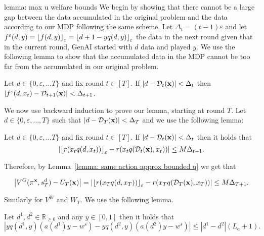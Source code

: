 \begin{proofof}{lemma: max u welfare bounds}
We begin by showing that there cannot be a large gap between the data accumulated in the original problem and the data according to our MDP following the same scheme.
Let $\Delta_t = (t-1)\varepsilon$ and let $f^\varepsilon(d, y) = {\left\lfloor f(d, y)\right\rfloor_{\varepsilon}} = {\left\lfloor d + 1 - yq(d, y)\right\rfloor_{\varepsilon}}$ the data in the next round given that in the current round, GenAI started with $d$ data and played $y$. We use the following lemma to show that the accumulated data in the MDP cannot be too far from the accumulated in our original problem.

\begin{lemma} \label{lemma: max u welfare data bound}
Let $d \in \{0, \varepsilon, \ldots T\}$ and fix round $t \in [T]$. If $\left| d - \mathcal{D}_t({\bf{x}}) \right| < \Delta_t$ then $\left| f^\varepsilon(d, x_t) - \mathcal{D}_{t+1}({\bf{x}}) \right| < \Delta_{t+1}$.
\end{lemma}

We now use backward induction to prove our lemma, starting at round $T$. Let $d \in \{0, \varepsilon, \ldots, T \}$ such that $\left| d - \mathcal{D}_T({\bf{x}})\right| < \Delta_T$ and we use the following lemma:

\begin{lemma} \label{lemma: same action approx bounded q}
Let $d \in \{0, \varepsilon, \ldots T\}$ and fix round $t \in [T]$. If $\left| d - \mathcal{D}_t({\bf{x}}) \right| < \Delta_t$ then it holds that
\[
\left| {\left\lfloor r(x_t q(d, x_t))\right\rfloor_{\varepsilon}} - r(x_t q(\mathcal{D}_t({\bf{x}}), x_t)) \right| \leq M \Delta_{t+1}.
\]
\end{lemma}


Therefore, by Lemma~\ref{lemma: same action approx bounded q} we get that

\begin{align*}
\left| V^G(\pi^{{\bf{x}}}, s_T^d) - U_T({\bf{x}}) \right| = \left| {\left\lfloor r(x_T q(d, x_T))\right\rfloor_{\varepsilon}} - r(x_T q(\mathcal{D}_T({\bf{x}}), x_T)) \right| \leq M \Delta_{T+1} .
\end{align*}

Similarly for $V^W$ and $W_T$. We use the following lemma.

\begin{lemma} \label{lemma: same action bounded welfare}
Let $d^1, d^2 \in \mathbb{R}_{\geq 0}$ and any $y \in [0, 1]$ then it holds that
\[
\left| yq(d^1, y)\left(a(d^1)y - w^s \right) - yq(d^2, y)\left(a(d^2)y - w^s \right) \right| \leq \left| d^1 - d^2 \right| (L_a + 1).
\]
\end{lemma}


\end{proofof}

